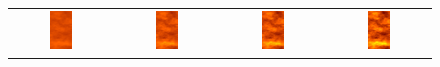 \begin{figure}[htb]
\centering
\begin {tabular}{@{}cccc@{}}
 \includegraphics[width=0.23\textwidth]{figures/VisitScreenshots/SPE1000/SPE1000_PERM_t01.png} &
 \includegraphics[width=0.23\textwidth]{figures/VisitScreenshots/SPE1000/SPE1000_PERM_t02.png} &
 \includegraphics[width=0.23\textwidth]{figures/VisitScreenshots/SPE1000/SPE1000_PERM_t03.png} &
 \includegraphics[width=0.23\textwidth]{figures/VisitScreenshots/SPE1000/SPE1000_PERM_t04.png} \\

\end{tabular}
\end{figure}
